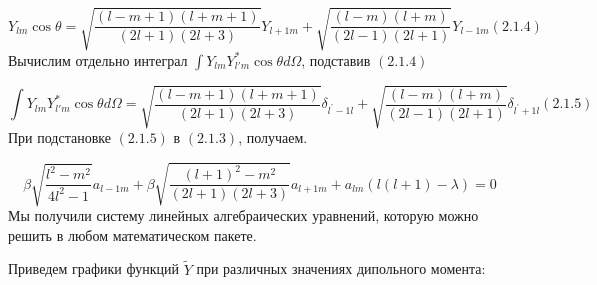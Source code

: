 \documentclass[a4paper]{article}
\begin{document}
\begin{equation*}
Y_{\mathit{lm}}\cos \theta
=\sqrt{\frac{(l-m+1)(l+m+1)}{\left(2l+1\right)(2l+3)}}Y_{l+1m}+\sqrt{\frac{(l-m)(l+m)}{\left(2l-1\right)(2l+1)}}Y_{l-1m}(2.1.4)
\end{equation*}
Вычислим отдельно
интеграл  $\int Y_{\mathit{lm}}Y_{l'm}^{\ast }\cos \theta
\mathit{d\Omega }$, подставив  $(2.1.4)$ 

\begin{equation*}
\int Y_{\mathit{lm}}Y_{l'm}^{\ast }\cos \theta \mathit{d\Omega
}=\sqrt{\frac{(l-m+1)(l+m+1)}{\left(2l+1\right)(2l+3)}}\delta
_{l^{'}-1l}+\sqrt{\frac{(l-m)(l+m)}{\left(2l-1\right)(2l+1)}}\delta _{l^{'}+1l}(2.1.5)
\end{equation*}
При подстановке  $(2.1.5)$ в 
$(2.1.3)$, получаем.

\begin{equation*}
\beta \sqrt{\frac{l^2-m^2}{4l^2-1}}a_{l-1m}+\beta
\sqrt{\frac{\left(l+1\right)^2-m^2}{\left(2l+1\right)(2l+3)}}a_{l+1m}+a_{\mathit{lm}}\left(l\left(l+1\right)-\lambda
\right)=0
\end{equation*}
Мы получили систему линейных алгебраических уравнений, которую можно решить в любом математическом пакете.

Приведем графики
функций  $\widetilde Y$ при
различных значениях дипольного момента:
\end{document}
